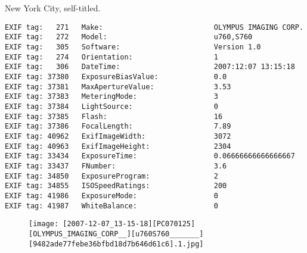 \section{\protect{}}
\noindent New York City, self-titled.
\noindent
\begin{lstlisting}
EXIF tag:   271   Make:                          OLYMPUS IMAGING CORP.  
EXIF tag:   272   Model:                         u760,S760       
EXIF tag:   305   Software:                      Version 1.0                    
EXIF tag:   274   Orientation:                   1
EXIF tag:   306   DateTime:                      2007:12:07 13:15:18
EXIF tag: 37380   ExposureBiasValue:             0.0
EXIF tag: 37381   MaxApertureValue:              3.53
EXIF tag: 37383   MeteringMode:                  3
EXIF tag: 37384   LightSource:                   0
EXIF tag: 37385   Flash:                         16
EXIF tag: 37386   FocalLength:                   7.89
EXIF tag: 40962   ExifImageWidth:                3072
EXIF tag: 40963   ExifImageHeight:               2304
EXIF tag: 33434   ExposureTime:                  0.06666666666666667
EXIF tag: 33437   FNumber:                       3.6
EXIF tag: 34850   ExposureProgram:               2
EXIF tag: 34855   ISOSpeedRatings:               200
EXIF tag: 41986   ExposureMode:                  0
EXIF tag: 41987   WhiteBalance:                  0

\end{lstlisting}
\clearpage
\begin{figure}
\raggedleft
\texttt{[image: [2007-12-07\_13-15-18][PC070125][OLYMPUS\_IMAGING\_CORP\_\_][u760S760\_\_\_\_\_\_\_][9482ade77febe36bfbd18d7b646d61c6].1.jpg]}
\end{figure}


\clearpage
